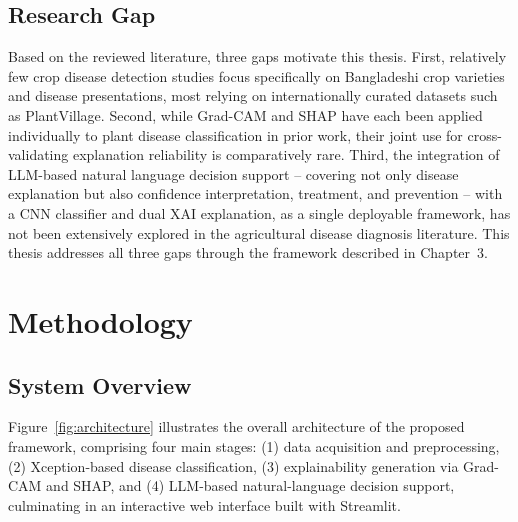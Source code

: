 \documentclass[12pt,a4paper,oneside]{report}
\begin{document}
\section{Research Gap}
Based on the reviewed literature, three gaps motivate this thesis. First, relatively few crop disease detection
studies focus specifically on Bangladeshi crop varieties and disease presentations, most relying on
internationally curated datasets such as PlantVillage. Second, while Grad-CAM and SHAP have each been applied
individually to plant disease classification in prior work, their joint use for cross-validating explanation
reliability is comparatively rare. Third, the integration of LLM-based natural language decision support --
covering not only disease explanation but also confidence interpretation, treatment, and prevention -- with a
CNN classifier and dual XAI explanation, as a single deployable framework, has not been extensively explored in
the agricultural disease diagnosis literature. This thesis addresses all three gaps through the framework
described in Chapter~3.

\chapter{Methodology}
\label{ch:methodology}

\section{System Overview}
Figure~\ref{fig:architecture} illustrates the overall architecture of the proposed framework, comprising four main
stages: (1) data acquisition and preprocessing, (2) Xception-based disease classification, (3) explainability
generation via Grad-CAM and SHAP, and (4) LLM-based natural-language decision support, culminating in an
interactive web interface built with Streamlit.
\end{document}
